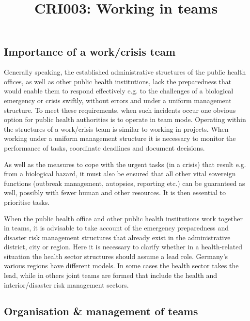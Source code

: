 \documentclass{article}
\begin{document}
\title{CRI003: Working in teams}

\maketitle


\subsection{Importance of a work/crisis team}\label{H6850322}



Generally speaking, the established administrative structures of the public health offices, as well as other public health institutions, lack the preparedness that would enable them to respond effectively e.g. to the challenges of a biological emergency or crisis swiftly, without errors and under a uniform management structure. To meet these requirements, when such incidents occur one obvious option for public health authorities is to operate in team mode. Operating within the structures of a work/crisis team is similar to working in projects. When working under a uniform management structure it is necessary to monitor the performance of tasks, coordinate deadlines and document decisions.


As well as the measures to cope with the urgent tasks (in a crisis) that result e.g. from a biological hazard, it must also be ensured that all other vital sovereign functions (outbreak management, autopsies, reporting etc.) can be guaranteed as well, possibly with fewer human and other resources. It is then essential to prioritise tasks.


When the public health office and other public health institutions work together in teams, it is advisable to take account of the emergency preparedness and disaster risk management structures that already exist in the administrative district, city or region. Here it is necessary to clarify whether in a health-related situation the health sector structures should assume a lead role. Germany's various regions have different models. In some cases the health sector takes the lead, while in others joint teams are formed that include the health and interior/disaster risk management sectors.


\subsection{Organisation \& management of teams}\label{H7878642}
\end{document}
